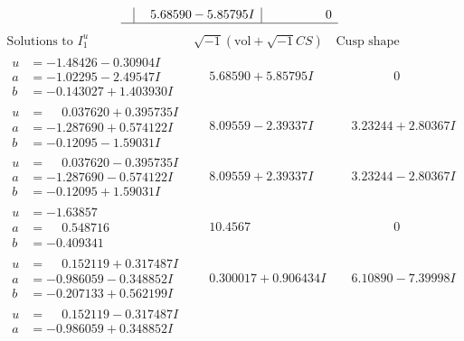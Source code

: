\documentclass[1p]{elsarticle_modified}
\theoremstyle{definition}
\newcommand{\I}{\sqrt{-1}}
\begin{document}
$$\begin{array}{c|c|c}
 & \phantom{-}5.68590 - 5.85795 I & \phantom{-0.000000 } 0\\
 \hline 
 \end{array}$$\newpage$$\begin{array}{c|c|c}  
\text{Solutions to }I^u_{1}& \I (\text{vol} + \sqrt{-1}CS) & \text{Cusp shape}\\
 \hline 
\begin{aligned}
u &= -1.48426 - 0.30904 I \\
a &= -1.02295 - 2.49547 I \\
b &= -0.143027 + 1.403930 I\end{aligned}
 & \phantom{-}5.68590 + 5.85795 I & \phantom{-0.000000 } 0 \\ \hline\begin{aligned}
u &= \phantom{-}0.037620 + 0.395735 I \\
a &= -1.287690 + 0.574122 I \\
b &= -0.12095 - 1.59031 I\end{aligned}
 & \phantom{-}8.09559 - 2.39337 I & \phantom{-}3.23244 + 2.80367 I \\ \hline\begin{aligned}
u &= \phantom{-}0.037620 - 0.395735 I \\
a &= -1.287690 - 0.574122 I \\
b &= -0.12095 + 1.59031 I\end{aligned}
 & \phantom{-}8.09559 + 2.39337 I & \phantom{-}3.23244 - 2.80367 I \\ \hline\begin{aligned}
u &= -1.63857\phantom{ +0.000000I} \\
a &= \phantom{-}0.548716\phantom{ +0.000000I} \\
b &= -0.409341\phantom{ +0.000000I}\end{aligned}
 & \phantom{-}10.4567\phantom{ +0.000000I} & \phantom{-0.000000 } 0 \\ \hline\begin{aligned}
u &= \phantom{-}0.152119 + 0.317487 I \\
a &= -0.986059 - 0.348852 I \\
b &= -0.207133 + 0.562199 I\end{aligned}
 & \phantom{-}0.300017 + 0.906434 I & \phantom{-}6.10890 - 7.39998 I \\ \hline\begin{aligned}
u &= \phantom{-}0.152119 - 0.317487 I \\
a &= -0.986059 + 0.348852 I \\

\end{aligned}
\end{array}$$
\end{document}
